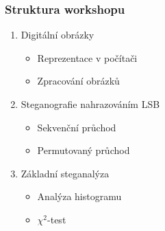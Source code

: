 \documentclass{beamer}
\begin{document}

\begin{frame}
\frametitle{Struktura workshopu}

\begin{enumerate}
\item Digitální obrázky
\begin{itemize}
\item Reprezentace v počítači
\item Zpracování obrázků
\end{itemize}
\item Steganografie nahrazováním LSB
\begin{itemize}
\item Sekvenční průchod
\item Permutovaný průchod
\end{itemize}
\item Základní steganalýza
\begin{itemize}
\item Analýza histogramu
\item $\chi^2$-test
\end{itemize}
\end{enumerate}
\end{frame}

\end{document}
